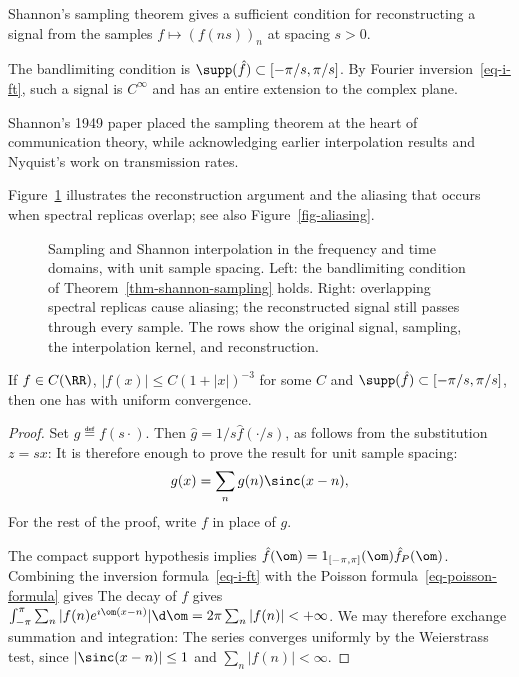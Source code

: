 Shannon's sampling theorem gives a sufficient condition for reconstructing a signal from the samples $f \mapsto (f(ns))_n$ at spacing $s>0$.
 
The bandlimiting condition is $\supp(\hat f) \subset [-\pi/s,\pi/s]$. By Fourier inversion~\eqref{eq-i-ft}, such a signal is $C^\infty$ and has an entire extension to the complex plane.
 
Shannon's 1949 paper placed the sampling theorem at the heart of communication theory, while acknowledging earlier interpolation results and Nyquist's work on transmission rates.
 
Figure~\ref{fig-sampling-aliasing} illustrates the reconstruction argument and the aliasing that occurs when spectral replicas overlap; see also Figure~\ref{fig-aliasing}.

\begin{figure}[tbp]
\centering
{}
\caption{Sampling and Shannon interpolation in the frequency and time domains, with unit sample spacing. Left: the bandlimiting condition of Theorem~\ref{thm-shannon-sampling} holds. Right: overlapping spectral replicas cause aliasing; the reconstructed signal still passes through every sample. The rows show the original signal, sampling, the interpolation kernel, and reconstruction.}
\label{fig-sampling-aliasing}
\end{figure}





\begin{thm} \label{thm-shannon-sampling}
	If $f\in C(\RR)$, $|f(x)| \leq C(1+|x|)^{-3}$ for some $C$ and $\supp(\hat f) \subset [-\pi/s,\pi/s]$, then one has
	with uniform convergence.
\end{thm}

\begin{proof} 
	Set $g \eqdef f(s \cdot)$. Then $\hat g=1/s \hat f(\cdot/s)$, as follows from the substitution $z=s x$:
	It is therefore enough to prove the result for unit sample spacing:
	$$
		g(x) = \sum_n g(n) \sinc(x-n), 
	$$
	For the rest of the proof, write $f$ in place of $g$.
	 
	The compact support hypothesis implies $\hat f(\om) = 1_{[-\pi,\pi]}(\om) \hat f_P(\om)$.  
	Combining the inversion formula~\eqref{eq-i-ft} with the Poisson formula~\eqref{eq-poisson-formula} gives
	The decay of $f$ gives $\int_{-\pi}^\pi \sum_n |f(n) e^{\imath \om (x-n)}| \d \om = 2\pi\sum_n |f(n)| < +\infty$. We may therefore exchange summation and integration:
The series converges uniformly by the Weierstrass test, since $|\sinc(x-n)|\leq 1$ and $\sum_n|f(n)|<\infty$.
\end{proof}

